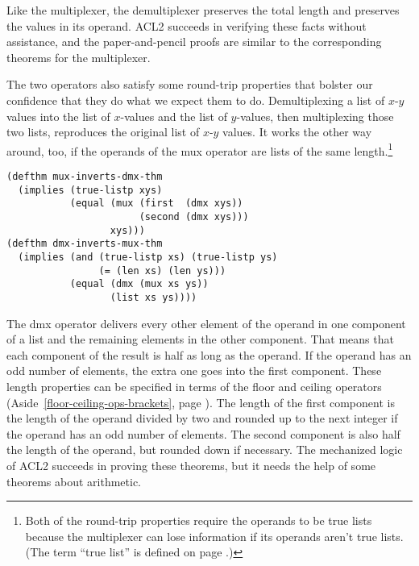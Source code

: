 Like the multiplexer,
the demultiplexer preserves the total length
and preserves the values in its operand.
ACL2 succeeds in verifying these facts without assistance,
and the paper-and-pencil proofs are similar to the corresponding
theorems for the multiplexer.

The two operators also satisfy some round-trip properties
that bolster our confidence that they do what we expect them to do.
Demultiplexing a list of $x$-$y$ values into the list of
$x$-values and the list of $y$-values, then multiplexing
those two lists, reproduces the original list of $x$-$y$ values.
It works the other way around, too, if the operands of
the \textsf{mux} operator are lists of the same length.\footnote{Both
of the round-trip properties require the operands to be
true lists because the multiplexer can lose information
if its operands aren't true lists.
(The term ``true list'' is defined on page \pageref{true-list-def}.)}

\label{thm:mux-inverts-dmx}\label{thm:dmx-inverts-mux}
\begin{Verbatim}
(defthm mux-inverts-dmx-thm
  (implies (true-listp xys)
           (equal (mux (first  (dmx xys))
                       (second (dmx xys)))
                  xys)))
(defthm dmx-inverts-mux-thm
  (implies (and (true-listp xs) (true-listp ys)
                (= (len xs) (len ys)))
           (equal (dmx (mux xs ys))
                  (list xs ys))))
\end{Verbatim}

The \textsf{dmx} operator delivers every other element of the operand in
one component of a list and the remaining elements in the other component.
That means that each component of the result is half as long as the operand.
If the operand has an odd number of elements, the extra one goes into the first component.
These length properties can be specified in terms of the \textsf{floor} and \textsf{ceiling}
operators (Aside~\ref{floor-ceiling-ops-brackets}, page \pageref{floor-ceiling-ops-brackets}).
The length of the first component is the length of the operand divided by two
and rounded up to the next integer if the operand has an odd number of elements.
The second component is also half the length of the operand, but rounded down if necessary.
The mechanized logic of ACL2 succeeds in proving these theorems,
but it needs the help of some theorems about arithmetic.

